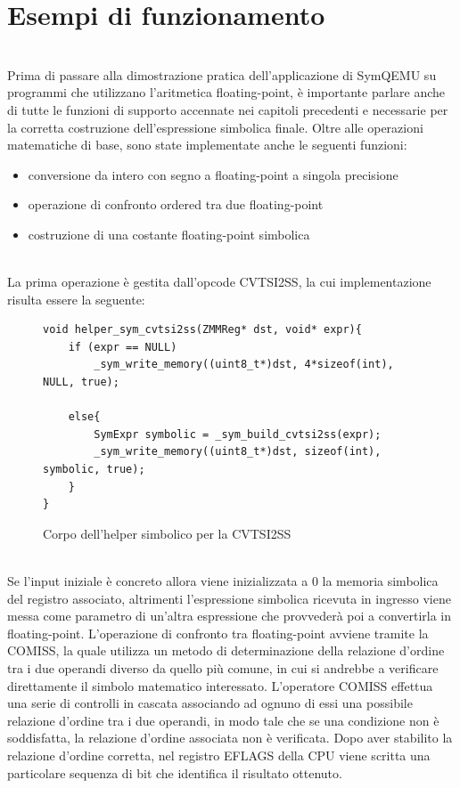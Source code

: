\documentclass[Lau, oneside]{sapthesis}%
\begin{document}
\chapter{Esempi di funzionamento}
\ \\
Prima di passare alla dimostrazione pratica dell'applicazione di SymQEMU su programmi che utilizzano l'aritmetica floating-point, è importante parlare anche di tutte le funzioni di supporto accennate nei capitoli precedenti e necessarie per la corretta costruzione dell'espressione simbolica finale.
\newline \newline
Oltre alle operazioni matematiche di base, sono state implementate anche le seguenti funzioni:
\begin{itemize}
    \item conversione da intero con segno a floating-point a singola precisione
    \item operazione di confronto ordered tra due floating-point
    \item costruzione di una costante floating-point simbolica
\end{itemize}
\ \\
La prima operazione è gestita dall'opcode CVTSI2SS, la cui implementazione risulta essere la seguente:
\begin{figure}[h]
\begin{lstlisting}[xleftmargin=0\textwidth, language=SymQEMU2, basicstyle=\small]
void helper_sym_cvtsi2ss(ZMMReg* dst, void* expr){
    if (expr == NULL)
        _sym_write_memory((uint8_t*)dst, 4*sizeof(int), NULL, true);

    else{
        SymExpr symbolic = _sym_build_cvtsi2ss(expr);
        _sym_write_memory((uint8_t*)dst, sizeof(int), symbolic, true);
    }
}
\end{lstlisting}
    \caption{Corpo dell’helper simbolico per la CVTSI2SS}
    \label{fig:helper_cvtsi2ss}
\end{figure}
\ \\ \newline
Se l'input iniziale è concreto allora viene inizializzata a 0 la memoria simbolica del registro associato, altrimenti l'espressione simbolica ricevuta in ingresso viene messa come parametro di un'altra espressione che provvederà poi a convertirla in floating-point.
\newline\newline
L'operazione di confronto tra floating-point avviene tramite la COMISS, la quale utilizza un metodo di determinazione della relazione d'ordine tra i due operandi diverso da quello più comune, in cui si andrebbe a verificare direttamente il simbolo matematico interessato.
\newline
L'operatore COMISS effettua una serie di controlli in cascata associando ad ognuno di essi una possibile relazione d'ordine tra i due operandi, in modo tale che se una condizione non è soddisfatta, la relazione d'ordine associata non è verificata.
\newline
Dopo aver stabilito la relazione d'ordine corretta, nel registro EFLAGS della CPU viene scritta una particolare sequenza di bit che identifica il risultato ottenuto.
\end{document}
